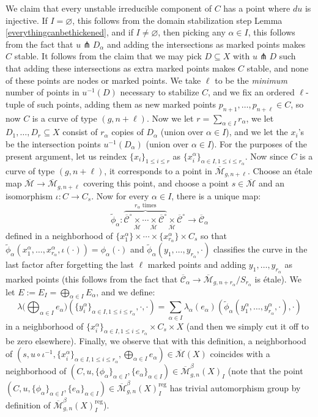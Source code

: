 \documentclass[12pt]{article}
\theoremstyle{definition}
\theoremstyle{remark}
\numberwithin{equation}{subsection}
\newcommand{\Mbar}{\overline{\mathcal M}}
\newcommand{\Cbar}{\overline{\mathcal C}}
\newcommand{\reg}{\mathrm{reg}}
\begin{document}
We claim that every unstable irreducible component of $C$ has a point where $du$ is injective.  If $I=\varnothing$, this follows from the domain stabilization step Lemma \ref{everythingcanbethickened}, and if $I\ne\varnothing$, then picking any $\alpha\in I$, this follows from the fact that $u\pitchfork D_\alpha$ and adding the intersections as marked points makes $C$ stable.  It follows from the claim that we may pick $D\subseteq X$ with $u\pitchfork D$ such that adding these intersections as extra marked points makes $C$ stable, and none of these points are nodes or marked points.  We take $\ell$ to be the \emph{minimum} number of points in $u^{-1}(D)$ necessary to stabilize $C$, and we fix an ordered $\ell$-tuple of such points, adding them as new marked points $p_{n+1},\ldots,p_{n+\ell}\in C$, so now $C$ is a curve of type $(g,n+\ell)$.  Now we let $r=\sum_{\alpha\in I}r_\alpha$, we let $D_1,\ldots,D_r\subseteq X$ consist of $r_\alpha$ copies of $D_\alpha$ (union over $\alpha\in I$), and we let the $x_i$'s be the intersection points $u^{-1}(D_\alpha)$ (union over $\alpha\in I$).  For the purposes of the present argument, let us reindex $\{x_i\}_{1\leq i\leq r}$ as $\{x^\alpha_i\}_{\alpha\in I,1\leq i\leq r_\alpha}$.  Now since $C$ is a curve of type $(g,n+\ell)$, it corresponds to a point in $\Mbar_{g,n+\ell}$.  Choose an \'etale map $\Mbar\to\Mbar_{g,n+\ell}$ covering this point, and choose a point $s\in\Mbar$ and an isomorphism $\iota:C\to C_s$.  Now for every $\alpha\in I$, there is a unique map:
\begin{equation}
\tilde\phi_\alpha:\overbrace{\Cbar^\circ\underset\Mbar\times\cdots\underset\Mbar\times\Cbar^\circ}^{r_\alpha\text{ times}}{}\underset\Mbar\times\Cbar^\circ\to\Cbar_\alpha
\end{equation}
defined in a neighborhood of $\{x_1^\alpha\}\times\cdots\times\{x_{r_\alpha}^\alpha\}\times C_s$ so that $\tilde\phi_\alpha(x^\alpha_1,\ldots,x^\alpha_{r_\alpha},\iota(\cdot))=\phi_\alpha(\cdot)$ and $\tilde\phi_\alpha(y_1,\ldots,y_{r_\alpha},\cdot)$ classifies the curve in the last factor after forgetting the last $\ell$ marked points and adding $y_1,\ldots,y_{r_\alpha}$ as marked points (this follows from the fact that $\Cbar_\alpha\to\Mbar_{g,n+r_\alpha}/S_{r_\alpha}$ is \'etale).  We let $E:=E_I=\bigoplus_{\alpha\in I}E_\alpha$, and we define:
\begin{equation*}
\lambda\biggl(\bigoplus_{\alpha\in I}e_\alpha\biggr)(\{y_i^\alpha\}_{\alpha\in I,1\leq i\leq r_\alpha},\cdot,\cdot)=\sum_{\alpha\in I}\lambda_\alpha(e_\alpha)(\tilde\phi_\alpha(y_1^\alpha,\ldots,y_{r_\alpha}^\alpha,\cdot),\cdot)
\end{equation*}
in a neighborhood of $\{x_i^\alpha\}_{\alpha\in I,1\leq i\leq r_\alpha}\times C_s\times X$ (and then we simply cut it off to be zero elsewhere).  Finally, we observe that with this definition, a neighborhood of $(s,u\circ\iota^{-1},\{x^\alpha_i\}_{\alpha\in I,1\leq i\leq r_\alpha},\bigoplus_{\alpha\in I}e_\alpha)\in\Mbar(X)$ coincides with a neighborhood of $(C,u,\{\phi_\alpha\}_{\alpha\in I},\{e_\alpha\}_{\alpha\in I})\in\Mbar^\beta_{g,n}(X)_I$ (note that the point $(C,u,\{\phi_\alpha\}_{\alpha\in I},\{e_\alpha\}_{\alpha\in I})\in\Mbar^\beta_{g,n}(X)_I^\reg$ has trivial automorphism group by definition of $\Mbar^\beta_{g,n}(X)_I^\reg$).
\end{document}

